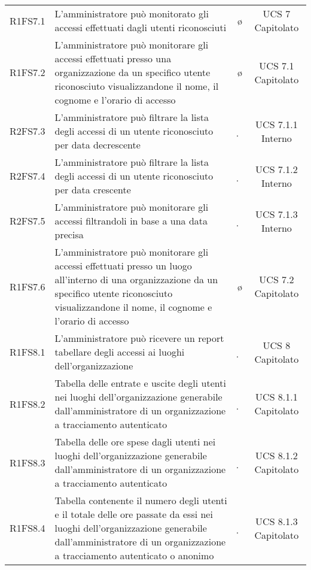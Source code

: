 {\begin{longtable}{ c C{8cm} c c}
R1FS7.1 & L'amministratore può monitorato gli accessi effettuati dagli utenti riconosciuti & \o & UCS 7 Capitolato\\

R1FS7.2 & L'amministratore può monitorare gli accessi effettuati presso una organizzazione da un specifico utente riconosciuto visualizzandone il nome, il cognome e l'orario di accesso & \o & UCS 7.1 Capitolato\\

R2FS7.3 & L’amministratore può filtrare la lista degli accessi di un utente riconosciuto per data decrescente & \d & UCS 7.1.1 Interno \\

R2FS7.4 & L’amministratore può filtrare la lista degli accessi di un utente riconosciuto per data crescente & \d & UCS 7.1.2 Interno \\

R2FS7.5 & L'amministratore può monitorare gli accessi filtrandoli in base a una data precisa & \d & UCS 7.1.3 Interno\\

R1FS7.6 & L'amministratore può monitorare gli accessi effettuati presso un luogo all'interno di una organizzazione da un specifico utente riconosciuto visualizzandone il nome, il cognome e l'orario di accesso & \o & UCS 7.2 Capitolato\\

R1FS8.1 & L'amministratore può ricevere un report tabellare degli accessi ai luoghi dell'organizzazione & \d & UCS 8 Capitolato\\

R1FS8.2 &  Tabella delle entrate e uscite degli utenti nei luoghi dell'organizzazione generabile dall'amministratore di un organizzazione a tracciamento autenticato & \d & UCS 8.1.1 Capitolato\\

R1FS8.3 & Tabella delle ore spese dagli utenti nei luoghi dell'organizzazione generabile dall'amministratore di un organizzazione a tracciamento autenticato & \d & UCS 8.1.2 Capitolato\\

R1FS8.4 & Tabella contenente il numero degli utenti e il totale delle ore passate da essi nei luoghi dell'organizzazione generabile dall'amministratore di un organizzazione a tracciamento autenticato o anonimo & \d & UCS 8.1.3 Capitolato\\


\end{longtable}}
